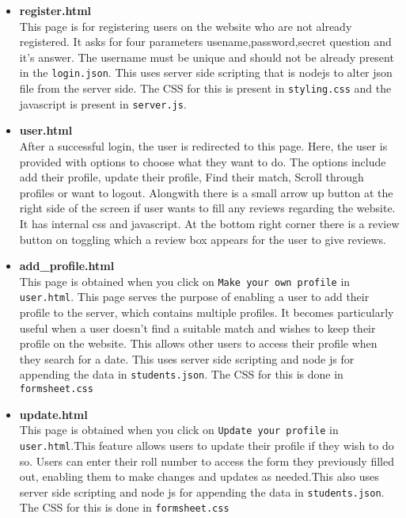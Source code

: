 \documentclass{article}
\begin{document}
\begin{itemize}
   \item \textbf{register.html}\\
   This page is for registering users on the website who are not already registered. It asks for four parameters usename,password,secret question and it's answer. The username must be unique and should not be already present in the \texttt{login.json}. This uses server side scripting that is nodejs to alter json file from the server side. The CSS for this is present in \texttt{styling.css} and the javascript is present in \texttt{server.js}.
  
   \item \textbf{user.html}\\
   After a successful login, the user is redirected to this page. Here, the user is provided with options to choose what they want to do. The options include add their profile, update their profile, Find their match, Scroll through profiles or want to logout. Alongwith there is a small arrow up button at the right side of the screen if user wants to fill any reviews regarding the website. It has internal css and javascript. At the bottom right corner there is a review button on toggling which a review box appears for the user to give reviews.
   
   \item \textbf{add\_profile.html}\\
   This page is obtained when you click on \texttt{Make your own profile} in \texttt{user.html}. This page serves the purpose of enabling a user to add their profile to the server, which contains multiple profiles. It becomes particularly useful when a user doesn't find a suitable match and wishes to keep their profile on the website. This allows other users to access their profile when they search for a date. This uses server side scripting and node js for appending the data in \texttt{students.json}. The CSS for this is done in \texttt{formsheet.css} 
  
   \item \textbf{update.html}\\
   This page is obtained when you click on \texttt{Update your profile} in \texttt{user.html}.This feature allows users to update their profile if they wish to do so. Users can enter their roll number to access the form they previously filled out, enabling them to make changes and updates as needed.This also uses server side scripting and node js for appending the data in \texttt{students.json}. The CSS for this is done in \texttt{formsheet.css} 
  

\end{itemize}
\end{document}
